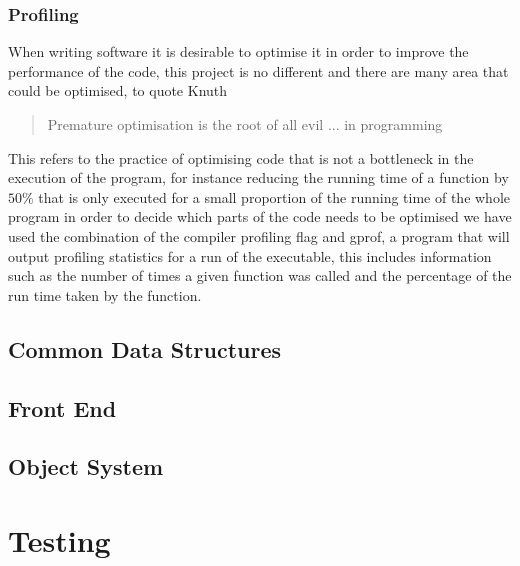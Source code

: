 \subsection{Profiling}
When writing software it is desirable to optimise it in order to improve the performance of the code, this project
is no different and there are many area that could be optimised, to quote Knuth

\begin{quotation}
{Premature optimisation is the root of all evil ... in programming \cite{Knuth74a}}
\end{quotation}

This refers to the practice of optimising code that is not a bottleneck in the execution of the program, for instance
reducing the running time of a function by $50\%$ that is only executed for a small proportion of the running time of
the whole program in order to decide which parts of the code needs to be optimised we have used the combination of
the compiler profiling flag and gprof, a program that will output profiling statistics for a run of the executable,
this includes information such as the number of times a given function was called and the percentage of the run time
taken by the function.

\newpage
\section{Common Data Structures}

\newpage
\section{Front End}

\newpage
\section{Object System}

\newpage

\newpage
\chapter{Testing}

